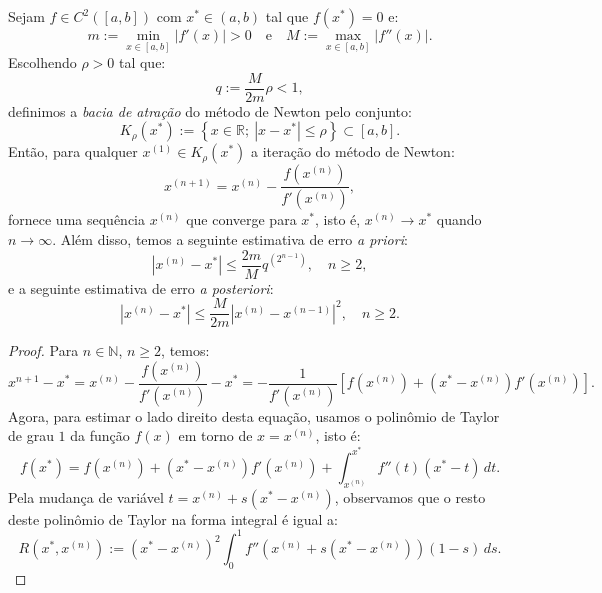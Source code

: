 \begin{ex}
\begin{teo}
  Sejam $f\in C^2([a, b])$ com $x^*\in (a, b)$ tal que $f(x^*) = 0$ e:
  \begin{equation}
    m := \min_{x\in [a, b]}|f'(x)| > 0\quad\text{e}\quad M := \max_{x\in [a, b]} |f''(x)|.
  \end{equation}
Escolhendo $\rho > 0$ tal que:
\begin{equation}
  q := \frac{M}{2m}\rho < 1,
\end{equation}
definimos a \emph{bacia de atração} do método de Newton pelo conjunto:
\begin{equation}
  K_\rho(x^*) := \left\{x\in\mathbb{R};~|x-x^*| \leq \rho\right\}\subset [a, b].
\end{equation}
Então, para qualquer $x^{(1)}\in K_\rho(x^*)$ a iteração do método de Newton:
\begin{equation}
  x^{(n+1)} = x^{(n)} - \frac{f(x^{(n)})}{f'(x^{(n)})},
\end{equation}
fornece uma sequência $x^{(n)}$ que converge para $x^*$, isto é, $x^{(n)}\to x^*$ quando $n\to \infty$. Além disso, temos a seguinte estimativa de erro \emph{a priori}:
\begin{equation}
  |x^{(n)} - x^*| \leq \frac{2m}{M}q^{(2^{n-1})},\quad n\geq 2,
\end{equation}
e a seguinte estimativa de erro \emph{a posteriori}:
\begin{equation}
  |x^{(n)} - x^*| \leq \frac{M}{2m}|x^{(n)} - x^{(n-1)}|^2,\quad n\geq 2.
\end{equation}
\end{teo}
\begin{proof}
  Para $n\in\mathbb{N}$, $n\geq 2$, temos:
  \begin{equation}\label{eq:forma}
    x^{n+1}-x^* = x^{(n)} - \frac{f(x^{(n)})}{f'(x^{(n)})} - x^* = -\frac{1}{f'(x^{(n)})}\left[f(x^{(n)})+(x^*-x^{(n)})f'(x^{(n)})\right].
  \end{equation}
Agora, para estimar o lado direito desta equação, usamos o polinômio de Taylor de grau $1$ da função $f(x)$ em torno de $x = x^{(n)}$, isto é:
\begin{equation}
  f(x^*) = f(x^{(n)}) + (x^* - x^{(n)})f'(x^{(n)}) + \int_{x^{(n)}}^{x^*} f''(t)(x^* - t)\,dt.
\end{equation}
Pela mudança de variável $t = x^{(n)} + s(x^* - x^{(n)})$, observamos que o resto deste polinômio de Taylor na forma integral é igual a:
\begin{equation}
  R(x^*,x^{(n)}) := (x^* - x^{(n)})^2\int_0^1 f''\left(x^{(n)} + s(x^* - x^{(n)})\right)(1-s)\,ds.

\end{equation}
\end{proof}
\end{ex}
